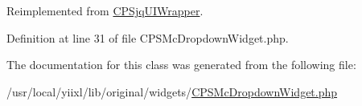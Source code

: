 Reimplemented from \hyperlink{classCPSjqUIWrapper_ae357f9dc377f7de0d12010b2ced28cbc}{CPSjqUIWrapper}.



Definition at line 31 of file CPSMcDropdownWidget.php.



The documentation for this class was generated from the following file:\begin{DoxyCompactItemize}
\item 
/usr/local/yiixl/lib/original/widgets/\hyperlink{CPSMcDropdownWidget_8php}{CPSMcDropdownWidget.php}\end{DoxyCompactItemize}
